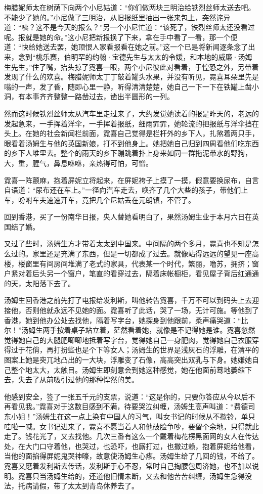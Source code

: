 \par 梅腊妮师太在树荫下向两个小尼姑道：“你们做两块三明治给铁烈丝师太送去吧。不能少了她的。”小尼做了三明治，从旧报纸里抽出一张来包上，突然诧异道：“咦？这不是今天的报么？”另一个小尼忙道：“该死了，铁烈丝师太还没看过呢。报就是她的命。”这小尼把新报换了下来，拿在手中看了一看，那一个便道：“快给她送去罢，她顶恨人家看报看在她之前。”这一个已是将新闻逐条念了出来，念到“桃乐赛，伯明罕的约翰·宝德先生与太太的令媛，和本地的威廉·汤姆生先生，”住了嘴，抬头掠了霓喜一眼，两个小尼彼此对看着，于惶恐之外，另带着发现了什么的欢喜。梅腊妮师太丁丁敲着罐头水果，并没有听见，霓喜耳朵里先是嗡的一声，发了昏，随即心里一静，听得清清楚楚，她自己一下一下在铁罐上凿小洞，有本事齐齐整整一路凿过去，凿出半圆形的一列。
\par 然而这时候铁烈丝师太从汽车里走过来了，大约发觉她读着的报是昨天的，老远的发起急来，一手挥着洋伞，一手挥着报纸，细雨霏霏，她轮流的把报纸与洋伞挡在头上。在她的社会新闻栏前面，霓喜自己觉得是栏杆外的乡下人，扎煞着两只手，眼看着汤姆生与他的英国新娘，打不到他身上。她把她自己归到四周看他们吃东西的乡下人堆里去。整个的雨天的乡下蹦跳着扑上身来如同一群拖泥带水的野狗，大，重，腥气，鼻息咻咻，亲热得可怕，可憎。
\par 霓喜一阵颤麻，抱着屏妮立将起来，在屏妮袴子上摸了一摸，假意要换尿布，自言自语道：“尿布还在车上。”一径向汽车走去，唤齐了几个大些的孩子，带他们上车，吩咐车夫速速开车，竟把几个尼姑丢在元朗镇，不管了。
\par 回到香港，买了一份南华日报，央人替她看明白了，果然汤姆生业于本月六日在英国结了婚。
\par 又过了些时，汤姆生方才带着太太到中国来。中间隔的两个多月，霓喜也不知是怎么过的。家里还是充满了东西，但是一切都成了过去。就像站得远远的望见一座高楼，楼窗里有间房间堆满了老式的家具，代表某一个时代，繁丽，噜苏，拥挤；窗户紧对着后头另一个窗户，笔直的看穿过去，隔着床帐橱柜，看见屋子背后红通通的天，太阳落下去了。
\par 汤姆生回香港之前先打了电报给发利斯，叫他转告霓喜，千万不可以到码头上去迎接他，否则他就永远不见她的面。霓喜听了此话，哭了一场，无计可施。等他到了香港，她到他办公处去找他，隔着写字台，她探身到他跟前，柔声痛哭道：“比尔！”汤姆生两手按着桌子站立着，茫然看着她，就像是不记得她是谁。霓喜忽然觉得她自己的大腿肥唧唧地抵着写字台，觉得她自己一身肥肉，觉得她自己衣服穿得过于花俏，再打扮些也是个下等女人；汤姆生的世界是浅灰石的浮雕，在清平的图案上她是突兀地凸出的一大块，浮雕变了石像，高高突出双乳与下身。她嫌她自己整个地太大，太触目。汤姆生即刻意会到她这种感觉，她在他面前蓦地萎缩下去，失去了从前吸引过他的那种悍然的美。
\par 他感到安全，签了一张五千元的支票，说道：“这是你的，只要你答应从今以后不再看见我。”霓喜对于这数目感到不满，待要哭泣纠缠，汤姆生高声叫道：“费德司东小姐！”汤姆生在这一点上染有中国人的习气，叫女书记的时候从不揿铃，单只哇啦一喊。女书记进来了，霓喜不愿当着人和他破脸争吵，要留个余地，只得就此走了。钱花光了，又去找他。几次三番有这么一个戴着梅花楞黑面网的女人在传达处，在大门口守着他，也哭过，也恐吓，也厮打过，也撒过赖，抱着屏妮给他看，当他的面掐得屏妮鬼哭神嚎，故意使汤姆生心疼。汤姆生给了几回的钱，不给了。霓喜又磨着发利斯去传话，发利斯于心不忍，常时自己掏腰包周济她，也不加以说明。霓喜只当汤姆生给的，还道他旧情未断，又去和他苦苦纠缠，汤姆生急得没法，托病请假，带了太太到青岛休养去了。
